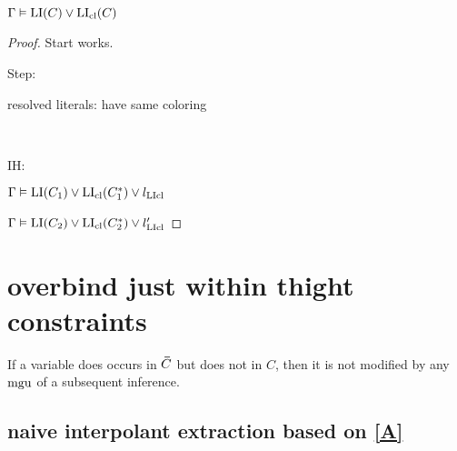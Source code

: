 \documentclass[,%
	draft=false,%
	numbers=noendperiod
	11pt,
	a4paper,
	oneside,%
	openany,
]{memoir}
\begin{document}
\begin{clemma}
	$\Gamma \vDash \operatorname{LI}(C) \lor \operatorname{LI}_{\operatorname{cl}}(C)$
\end{clemma}
\begin{proof}
	Start works.

	Step:

	resolved literals: have same coloring

	~

	IH:

	$\Gamma \vDash \operatorname{LI}(C_1) \lor \operatorname{LI}_{\operatorname{cl}}(C_1^*) \lor l_{\operatorname{LIcl}}$

	$\Gamma \vDash \operatorname{LI}(C_2) \lor \operatorname{LI}_{\operatorname{cl}}(C_2^*) \lor l'_{\operatorname{LIcl}}$
\end{proof}


\chapter{overbind just within thight constraints}

\begin{lemma}
	\label{A}
	If a variable does occurs in $\bm\bar C$ but does not in $C$, then it is not modified by any $\operatorname{mgu}$ of a subsequent inference.
\end{lemma}

\section{naive interpolant extraction based on \ref{A}}
\end{document}
